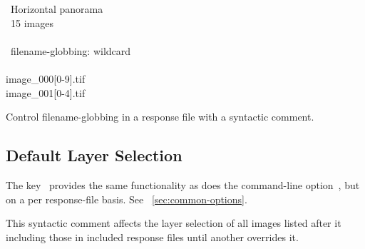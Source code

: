 \begin{exemplar}[htbp]
  \begin{literal}
    ~Horizontal panorama \\
    ~15 images \\
    \mbox{} \\
    ~filename-globbing: wildcard \\
    \mbox{} \\
    image\_000[0-9].tif \\
    image\_001[0-4].tif \\
  \end{literal}

  \caption[Filename-globbing syntactic comment]{\label{ex:globbing-algorithm}Control
    filename-globbing in a response file with a syntactic comment.}
\end{exemplar}


\subsection[Default Layer Selection]{\label{sec:default-layer-selection}%
  Default Layer Selection}

The key~ provides the same functionality as does the
command\hyp{}line option~, but on a per response\hyp{}file basis.  See
\sectionName~\ref{sec:common-options}.

This syntactic comment affects the layer selection of all images listed after it including those
in included response files until another  overrides it.



